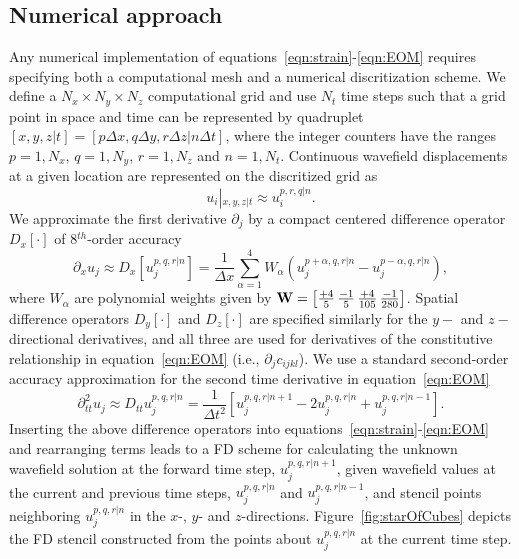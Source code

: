 \subsection{Numerical approach}
 
Any numerical implementation of equations~\ref{eqn:strain}-\ref{eqn:EOM} requires specifying both a computational mesh and a numerical discritization scheme.  We define a $N_x \times N_y \times N_z$ computational grid and use $N_t$ time steps such that a grid point in space and time can be represented by quadruplet $[x,y,z|t]=[p \Delta x, q \Delta y, r\Delta z| n\Delta t]$, where the integer counters have the ranges $p=1,N_x$, $q=1,N_y$, $r=1,N_z$ and $n=1,N_t$.  Continuous wavefield displacements at a given location are represented on the discritized grid as
\begin{equation}
u_i\left|_{x,y,z|t} \right. \approx u_i^{p,r,q|n}.
\end{equation}
We approximate the first derivative $\partial_j$ by a compact centered difference operator $D_x[\cdot]$ of 8$^{th}$-order accuracy \cite[]{Trefethen}
\begin{equation} \label{eqn:Forward}
\partial_x u_j \approx D_x [ u_j^{p,q,r|n}] = \frac{1}{\Delta x} \sum_{\alpha=1}^4 W_\alpha \left( u^{p+\alpha,q,r|n}_j-u^{p-\alpha,q,r|n}_j \right),
\end{equation}
where $W_\alpha$ are polynomial weights given by ${\bf W}=\left[\frac{+4}{5}\, \frac{-1}{5} \, \frac{+4}{105} \, \frac{-1}{280} \right]$.  Spatial difference operators $D_y[\cdot]$ and $D_z[\cdot]$ are specified similarly for the $y-$ and $z-$directional derivatives, and all three are used for derivatives of the constitutive relationship in equation~\ref{eqn:EOM} (i.e., $\partial_j c_{ijkl}$).  We use a standard second-order accuracy approximation for the second time derivative in equation~\ref{eqn:EOM} 
\begin{equation}
\partial^2_{tt} u_j \approx D_{tt} u_j^{p,q,r|n} = \frac{1}{\Delta t^2} \left[ u_j^{p,q,r|n+1}-2 u_j^{p,q,r|n}+u_j^{p,q,r|n-1}   \right].
\end{equation}
Inserting the above difference operators into equations~\ref{eqn:strain}-\ref{eqn:EOM} and rearranging terms leads to a FD scheme for calculating the unknown wavefield solution at the forward time step, $u_j^{p,q,r|n+1}$, given wavefield values at the current and previous time steps, $u_j^{p,q,r|n}$ and $u_j^{p,q,r|n-1}$, and stencil points neighboring $u_j^{p,q,r|n}$ in the $x$-, $y$- and $z$-directions.  Figure~\ref{fig:starOfCubes} depicts the FD stencil constructed from the points about $u_j^{p,q,r|n}$ at the current time step.

